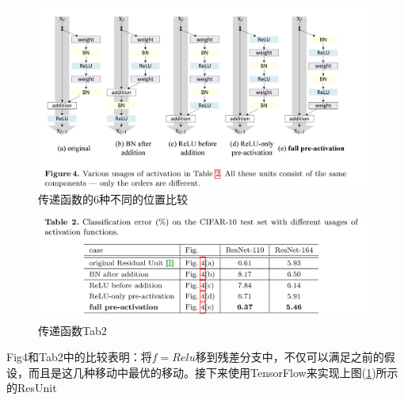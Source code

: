             \begin{figure}[H]
            \centering
            \includegraphics[width=12cm]{images/Transfer_func_of_six_different_location_compare.jpg}
            \caption{传递函数的6种不同的位置比较}
            \label{fig:传递函数的6种不同的位置比较}
            \end{figure}
            \begin{figure}[H]
            \centering
            \includegraphics[width=12cm]{images/Transfer_functab2.jpg}
            \caption{传递函数Tab2}
            \label{fig:传递函数Tab2}
            \end{figure}
            Fig4和Tab2中的比较表明：将$f=Relu$移到残差分支中，不仅可以满足之前的假设，而且是这几种移动中最优的移动。接下来使用TensorFlow来实现上图(\ref{fig:传递函数的6种不同的位置比较})所示的ResUnit
